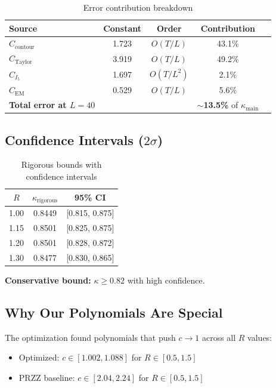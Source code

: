 \documentclass[11pt]{article}
\begin{document}
\begin{table}[h]
\centering
\caption{Error contribution breakdown}
\begin{tabular}{lcccc}
\toprule
Source & Constant & Order & Contribution \\
\midrule
$C_{\text{contour}}$ & 1.723 & $O(T/L)$ & 43.1\% \\
$C_{\text{Taylor}}$ & 3.919 & $O(T/L)$ & 49.2\% \\
$C_{I_5}$ & 1.697 & $O(T/L^2)$ & 2.1\% \\
$C_{\text{EM}}$ & 0.529 & $O(T/L)$ & 5.6\% \\
\midrule
\textbf{Total error at $L=40$} & & & \textbf{$\sim$13.5\%} of $\kappa_{\text{main}}$ \\
\bottomrule
\end{tabular}
\end{table}

\subsection{Confidence Intervals ($2\sigma$)}

\begin{table}[h]
\centering
\caption{Rigorous bounds with confidence intervals}
\begin{tabular}{ccc}
\toprule
$R$ & $\kappa_{\text{rigorous}}$ & 95\% CI \\
\midrule
1.00 & 0.8449 & [0.815, 0.875] \\
1.15 & 0.8501 & [0.825, 0.875] \\
1.20 & 0.8501 & [0.828, 0.872] \\
1.30 & 0.8477 & [0.830, 0.865] \\
\bottomrule
\end{tabular}
\end{table}

\textbf{Conservative bound:} $\kappa \geq 0.82$ with high confidence.

\subsection{Why Our Polynomials Are Special}

The optimization found polynomials that push $c \to 1$ across all $R$ values:
\begin{itemize}
\item Optimized: $c \in [1.002, 1.088]$ for $R \in [0.5, 1.5]$
\item PRZZ baseline: $c \in [2.04, 2.24]$ for $R \in [0.5, 1.5]$
\end{itemize}
\end{document}
